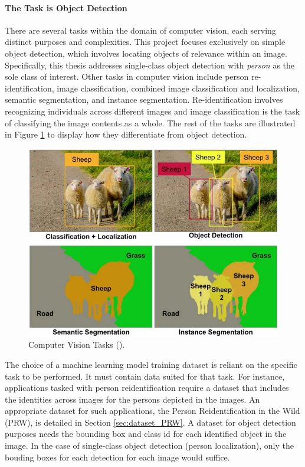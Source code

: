 \newpage
\paragraph{The Task is Object Detection}
\label{sec:scope_object_detection}
There are several tasks within the domain of computer vision, each serving distinct purposes and complexities. This project focuses exclusively on simple object detection, which involves locating objects of relevance within an image. Specifically, this thesis addresses single-class object detection with \textit{person} as the sole class of interest. Other tasks in computer vision include person re-identification, image classification, combined image classification and localization, semantic segmentation, and instance segmentation. Re-identification involves recognizing individuals across different images and image classification is the task of classifying the image contents as a whole. The rest of the tasks are illustrated in Figure \ref{fig:computer_vision_tasks} to display how they differentiate from object detection. 

\begin{figure}[H]
    \centering
    \includegraphics[width=0.75\linewidth]{Images/computer_vision_tasks.png}
    \caption{Computer Vision Tasks (\cite{mu2021object_detection_operations}).}
    \label{fig:computer_vision_tasks}
\end{figure}

The choice of a machine learning model training dataset is reliant on the specific task to be performed. It must contain data suited for that task. For instance, applications tasked with person reidentification require a dataset that includes the identities across images for the persons depicted in the images. An appropriate dataset for such applications, the Person Reidentification in the Wild (PRW), is detailed in Section \ref{sec:dataset_PRW}. A dataset for object detection purposes needs the bounding box and class id for each identified object in the image. In the case of single-class object detection (person localization), only the bouding boxes for each detection for each image would suffice.

